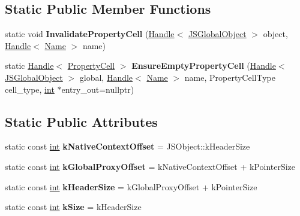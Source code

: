 \subsection*{Static Public Member Functions}
\begin{DoxyCompactItemize}
\item 
\mbox{\label{classv8_1_1internal_1_1JSGlobalObject_a44356fa85dc699669cf67fbcae2e1025}} 
static void {\bfseries Invalidate\+Property\+Cell} (\mbox{\hyperlink{classv8_1_1internal_1_1Handle}{Handle}}$<$ \mbox{\hyperlink{classv8_1_1internal_1_1JSGlobalObject}{J\+S\+Global\+Object}} $>$ object, \mbox{\hyperlink{classv8_1_1internal_1_1Handle}{Handle}}$<$ \mbox{\hyperlink{classv8_1_1internal_1_1Name}{Name}} $>$ name)
\item 
\mbox{\label{classv8_1_1internal_1_1JSGlobalObject_ac3ab88276c86a0e85d3db9715a36d79f}} 
static \mbox{\hyperlink{classv8_1_1internal_1_1Handle}{Handle}}$<$ \mbox{\hyperlink{classv8_1_1internal_1_1PropertyCell}{Property\+Cell}} $>$ {\bfseries Ensure\+Empty\+Property\+Cell} (\mbox{\hyperlink{classv8_1_1internal_1_1Handle}{Handle}}$<$ \mbox{\hyperlink{classv8_1_1internal_1_1JSGlobalObject}{J\+S\+Global\+Object}} $>$ global, \mbox{\hyperlink{classv8_1_1internal_1_1Handle}{Handle}}$<$ \mbox{\hyperlink{classv8_1_1internal_1_1Name}{Name}} $>$ name, Property\+Cell\+Type cell\+\_\+type, \mbox{\hyperlink{classint}{int}} $\ast$entry\+\_\+out=nullptr)
\end{DoxyCompactItemize}
\subsection*{Static Public Attributes}
\begin{DoxyCompactItemize}
\item 
\mbox{\label{classv8_1_1internal_1_1JSGlobalObject_a99a21c71d44a6456ee78e5f1d8d176f5}} 
static const \mbox{\hyperlink{classint}{int}} {\bfseries k\+Native\+Context\+Offset} = J\+S\+Object\+::k\+Header\+Size
\item 
\mbox{\label{classv8_1_1internal_1_1JSGlobalObject_a1c45d2940692ce5e8205be1613041c90}} 
static const \mbox{\hyperlink{classint}{int}} {\bfseries k\+Global\+Proxy\+Offset} = k\+Native\+Context\+Offset + k\+Pointer\+Size
\item 
\mbox{\label{classv8_1_1internal_1_1JSGlobalObject_a34edd920371e7a8c24b618a401a5e78e}} 
static const \mbox{\hyperlink{classint}{int}} {\bfseries k\+Header\+Size} = k\+Global\+Proxy\+Offset + k\+Pointer\+Size
\item 
\mbox{\label{classv8_1_1internal_1_1JSGlobalObject_a5dcb192b8930d640333fe390b2d5cfb8}} 
static const \mbox{\hyperlink{classint}{int}} {\bfseries k\+Size} = k\+Header\+Size
\end{DoxyCompactItemize}
